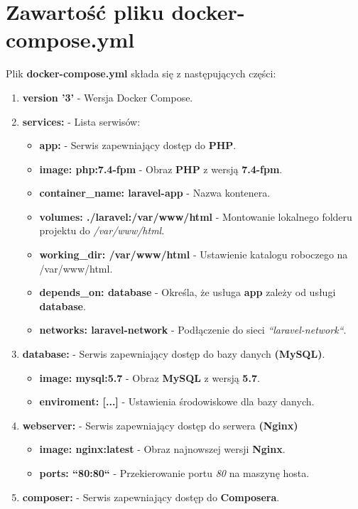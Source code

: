 \documentclass{article}
\begin{document}
\section{Zawartość pliku docker-compose.yml}
Plik \textbf{docker-compose.yml} składa się z następujących części:
\begin{enumerate}
    \item \textbf{version '3'} - Wersja Docker Compose. 
    \item \textbf{services:} - Lista serwisów:
    \begin{itemize}
        \item \textbf{app:} - Serwis zapewniający dostęp do \textbf{PHP}.
        \item \textbf{image: php:7.4-fpm} - Obraz \textbf{PHP} z wersją \textbf{7.4-fpm}.
        \item \textbf{container\_name: laravel-app} - Nazwa kontenera. 
        \item \textbf{volumes: ./laravel:/var/www/html} - Montowanie lokalnego folderu projektu do \textit{/var/www/html}.
        \item \textbf{working\_dir: /var/www/html} - Ustawienie katalogu roboczego na /var/www/html.
        \item \textbf{depends\_on: database} - Określa, że usługa \textbf{app} zależy od usługi \textbf{database}.
        \item \textbf{networks: laravel-network} - Podłączenie do sieci \textit{``laravel-network``}.
    \end{itemize}  
    \item \textbf{database:} - Serwis zapewniający dostęp do bazy danych \textbf{(MySQL)}.
    \begin{itemize}
        \item \textbf{image: mysql:5.7} - Obraz \textbf{MySQL} z wersją \textbf{5.7}.
        \item \textbf{enviroment: [...]} - Ustawienia środowiskowe dla bazy danych.
    \end{itemize}
    \item \textbf{webserver:} - Serwis zapewniający dostęp do serwera \textbf{(Nginx)}
    \begin{itemize}
        \item \textbf{image: nginx:latest} - Obraz najnowszej wersji \textbf{Nginx}.
        \item \textbf{ports: ``80:80``} - Przekierowanie portu \textit{80} na maszynę hosta.
    \end{itemize}
    \item \textbf{composer:} - Serwis zapewniający dostęp do \textbf{Composera}.

\end{enumerate}
\end{document}
